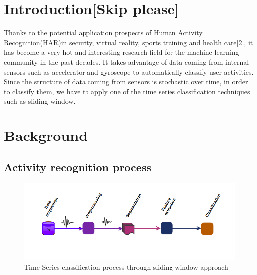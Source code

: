 \section{Introduction[Skip please]}
Thanks to the potential application prospects of Human Activity Recognition(HAR)in security, virtual reality, sports training and health care[2], it has become a very hot and interesting research field for the machine-learning community in the past decades. It takes advantage of data coming from internal sensors such as accelerator and gyroscope to automatically classify user activities. Since the structure of data coming from sensors is stochastic over time, in order to classify them, we have to apply one of the time series classification techniques such as sliding window.

\section{Background}
\subsection{Activity recognition process}\label{subsec:ARP}

\begin{figure}[h]
    \centering
    \includegraphics[width=.5\textwidth]{Figures/HARP.png}
    \caption{Time Series classification process through sliding window approach}
    \label{fig:tsprocess}
\end{figure}




